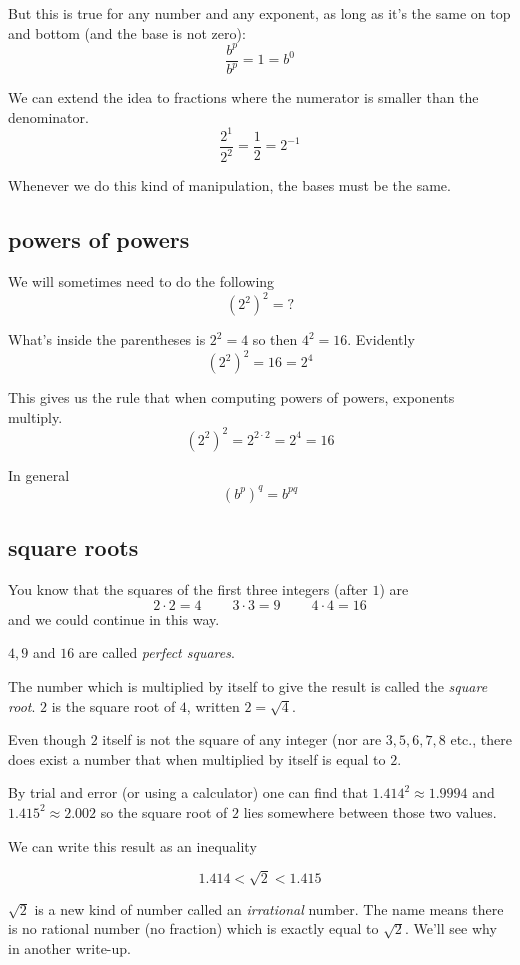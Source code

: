 \documentclass[11pt, oneside]{article}
\begin{document}
But this is true for any number and any exponent, as long as it's the same on top and bottom (and the base is not zero):
\[ \frac{b^p}{b^p} = 1 = b^0 \]

We can extend the idea to fractions where the numerator is smaller than the denominator.
\[ \frac{2^1}{2^2} = \frac{1}{2} = 2^{-1} \]

Whenever we do this kind of manipulation, the bases must be the same.

\subsection*{powers of powers}

We will sometimes need to do the following
\[ (2^2)^2  = \text{?} \]

What's inside the parentheses is $2^2 = 4$ so then $4^2 = 16$.  Evidently
\[ (2^2)^2  = 16 = 2^4 \]

This gives us the rule that when computing powers of powers, exponents multiply.
\[ (2^2)^2 = 2^{2 \cdot 2} = 2^4 = 16 \]

In general
\[ (b^p)^q = b^{pq} \]

\subsection*{square roots}

You know that the squares of the first three integers (after $1$) are
\[ 2 \cdot 2 = 4 \ \ \ \ \ \ \ \ \ \ 3 \cdot 3 = 9 \ \ \ \ \ \ \ \ \ \ 4 \cdot 4 = 16 \]
and we could continue in this way.

$4,9$ and $16$ are called \emph{perfect squares}.

The number which is multiplied by itself to give the result is called the \emph{square root}.  $2$ is the square root of $4$, written $2 = \sqrt{4}$.

Even though $2$ itself is not the square of any integer (nor are $3,5,6,7,8$ etc., there does exist a number that when multiplied by itself is equal to $2$.  

By trial and error (or using a calculator) one can find that $1.414^2 \approx 1.9994$ and $1.415^2 \approx 2.002$ so the square root of $2$ lies somewhere between those two values.  

We can write this result as an inequality

\[ 1.414 < \sqrt{2} < 1.415 \]

$\sqrt{2}$ is a new kind of number called an \emph{irrational} number.  The name means there is no rational number (no fraction) which is exactly equal to $\sqrt{2}$.  We'll see why in another write-up.  
\end{document}
